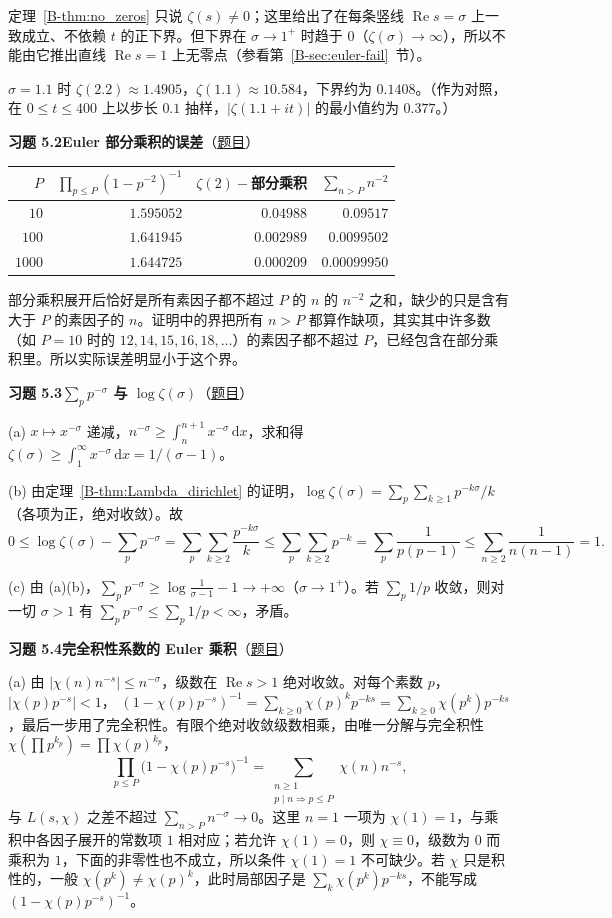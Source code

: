 \documentclass[11pt,a4paper]{article}
\newcommand{\dd}{\,\mathrm{d}}
\renewcommand{\Re}{\operatorname{Re}}
\newcommand{\bref}[1]{\ref*{B-#1}}
\newcommand{\Sol}[2]{%
  \par\addvspace{1.2em}\noindent
  \hypertarget{s:#1}{}\textbf{习题 #1\quad #2}\hfill{\small（\hyperlink{q:#1}{题目}）}\par
  \nopagebreak\smallskip}
\begin{document}
定理~\bref{thm:no_zeros} 只说 $\zeta(s)\ne0$；这里给出了在每条竖线 $\Re s=\sigma$ 上一致成立、不依赖 $t$ 的正下界。但下界在 $\sigma\to1^+$ 时趋于 $0$（$\zeta(\sigma)\to\infty$），所以不能由它推出直线 $\Re s=1$ 上无零点（参看第~\bref{sec:euler-fail}~节）。

$\sigma=1.1$ 时 $\zeta(2.2)\approx1.4905$，$\zeta(1.1)\approx10.584$，下界约为 $0.1408$。（作为对照，在 $0\le t\le400$ 上以步长 $0.1$ 抽样，$|\zeta(1.1+it)|$ 的最小值约为 $0.377$。）

\Sol{5.2}{Euler 部分乘积的误差}
\begin{center}
\begin{tabular}{rrrr}
\toprule
$P$ & $\prod_{p\le P}(1-p^{-2})^{-1}$ & $\zeta(2)-$部分乘积 & $\sum_{n>P}n^{-2}$\\
\midrule
$10$ & $1.595052$ & $0.04988$ & $0.09517$\\
$100$ & $1.641945$ & $0.002989$ & $0.0099502$\\
$1000$ & $1.644725$ & $0.000209$ & $0.00099950$\\
\bottomrule
\end{tabular}
\end{center}
部分乘积展开后恰好是所有素因子都不超过 $P$ 的 $n$ 的 $n^{-2}$ 之和，缺少的只是含有大于 $P$ 的素因子的 $n$。证明中的界把所有 $n>P$ 都算作缺项，其实其中许多数（如 $P=10$ 时的 $12,14,15,16,18,\dots$）的素因子都不超过 $P$，已经包含在部分乘积里。所以实际误差明显小于这个界。

\Sol{5.3}{$\sum_pp^{-\sigma}$ 与 $\log\zeta(\sigma)$}
(a) $x\mapsto x^{-\sigma}$ 递减，$n^{-\sigma}\ge\int_n^{n+1}x^{-\sigma}\dd x$，求和得 $\zeta(\sigma)\ge\int_1^\infty x^{-\sigma}\dd x=1/(\sigma-1)$。

(b) 由定理~\bref{thm:Lambda_dirichlet} 的证明，$\log\zeta(\sigma)=\sum_p\sum_{k\ge1}p^{-k\sigma}/k$（各项为正，绝对收敛）。故
\[
  0\le\log\zeta(\sigma)-\sum_pp^{-\sigma}=\sum_p\sum_{k\ge2}\frac{p^{-k\sigma}}k\le\sum_p\sum_{k\ge2}p^{-k}=\sum_p\frac1{p(p-1)}\le\sum_{n\ge2}\frac1{n(n-1)}=1 .
\]

(c) 由 (a)(b)，$\sum_pp^{-\sigma}\ge\log\frac1{\sigma-1}-1\to+\infty$（$\sigma\to1^+$）。若 $\sum_p1/p$ 收敛，则对一切 $\sigma>1$ 有 $\sum_pp^{-\sigma}\le\sum_p1/p<\infty$，矛盾。

\Sol{5.4}{完全积性系数的 Euler 乘积}
(a) 由 $|\chi(n)n^{-s}|\le n^{-\sigma}$，级数在 $\Re s>1$ 绝对收敛。对每个素数 $p$，$|\chi(p)p^{-s}|<1$，
$(1-\chi(p)p^{-s})^{-1}=\sum_{k\ge0}\chi(p)^kp^{-ks}=\sum_{k\ge0}\chi(p^k)p^{-ks}$，最后一步用了完全积性。有限个绝对收敛级数相乘，由唯一分解与完全积性 $\chi(\prod p^{k_p})=\prod\chi(p)^{k_p}$，
\[
  \prod_{p\le P}\bigl(1-\chi(p)p^{-s}\bigr)^{-1}=\sum_{\substack{n\ge1\\ p\mid n\Rightarrow p\le P}}\chi(n)n^{-s},
\]
与 $L(s,\chi)$ 之差不超过 $\sum_{n>P}n^{-\sigma}\to0$。这里 $n=1$ 一项为 $\chi(1)=1$，与乘积中各因子展开的常数项 $1$ 相对应；若允许 $\chi(1)=0$，则 $\chi\equiv0$，级数为 $0$ 而乘积为 $1$，下面的非零性也不成立，所以条件 $\chi(1)=1$ 不可缺少。若 $\chi$ 只是积性的，一般 $\chi(p^k)\ne\chi(p)^k$，此时局部因子是 $\sum_k\chi(p^k)p^{-ks}$，不能写成 $(1-\chi(p)p^{-s})^{-1}$。
\end{document}
